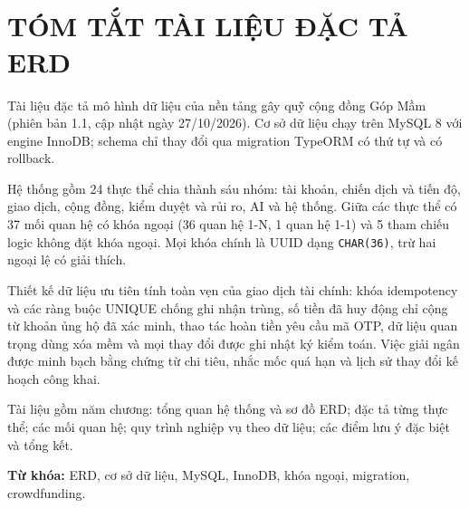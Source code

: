 \section*{\fontsize{18pt}{18pt}\selectfont\MakeUppercase{\de}\\TÓM TẮT TÀI LIỆU ĐẶC TẢ ERD}

Tài liệu đặc tả mô hình dữ liệu của nền tảng gây quỹ cộng đồng Góp Mầm (phiên bản 1.1, cập nhật ngày 27/10/2026). Cơ sở dữ liệu chạy trên MySQL 8 với engine InnoDB; schema chỉ thay đổi qua migration TypeORM có thứ tự và có rollback.

Hệ thống gồm 24 thực thể chia thành sáu nhóm: tài khoản, chiến dịch và tiến độ, giao dịch, cộng đồng, kiểm duyệt và rủi ro, AI và hệ thống. Giữa các thực thể có 37 mối quan hệ có khóa ngoại (36 quan hệ 1-N, 1 quan hệ 1-1) và 5 tham chiếu logic không đặt khóa ngoại. Mọi khóa chính là UUID dạng \texttt{CHAR(36)}, trừ hai ngoại lệ có giải thích.

Thiết kế dữ liệu ưu tiên tính toàn vẹn của giao dịch tài chính: khóa idempotency và các ràng buộc UNIQUE chống ghi nhận trùng, số tiền đã huy động chỉ cộng từ khoản ủng hộ đã xác minh, thao tác hoàn tiền yêu cầu mã OTP, dữ liệu quan trọng dùng xóa mềm và mọi thay đổi được ghi nhật ký kiểm toán. Việc giải ngân được minh bạch bằng chứng từ chi tiêu, nhắc mốc quá hạn và lịch sử thay đổi kế hoạch công khai.

Tài liệu gồm năm chương: tổng quan hệ thống và sơ đồ ERD; đặc tả từng thực thể; các mối quan hệ; quy trình nghiệp vụ theo dữ liệu; các điểm lưu ý đặc biệt và tổng kết.

\textbf{Từ khóa:} ERD, cơ sở dữ liệu, MySQL, InnoDB, khóa ngoại, migration, crowdfunding.

\newpage
